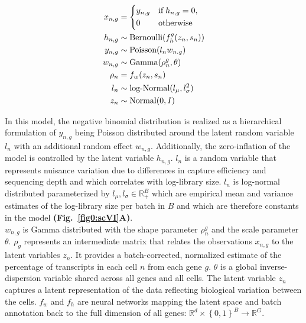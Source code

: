\begin{align*}
x_{n,g} & = 
 \left\lbrace
  \begin{aligned}
    & y_{n,g} && \textnormal{if} \; h_{n,g} = 0,  \\ 
    & 0 && \textnormal{otherwise}    	    
  \end{aligned}
\right.\\
h_{n,g} & \sim \textnormal{Bernoulli}(f_h^g(z_n,s_n))\\
y_{n,g} & \sim \textnormal{Poisson}(l_nw_{n.g})\\
w_{n,g} & \sim \textnormal{Gamma}(\rho^g_n, \theta)\\
\rho_n & = f_w(z_n,s_n)\\
l_n & \sim \textnormal{log-Normal}(l_{\mu},l^2_{\sigma})\\
z_n & \sim \textnormal{Normal}(0,I)
\end{align*}


In this model, the negative binomial distribution is realized as a hierarchical formulation of $y_{n,g}$ being Poisson distributed around the latent random variable $l_n$ with an additional random effect $w_{n,g}$. Additionally, the zero-inflation of the model is controlled by the latent variable $h_{n,g}$. $l_n$ is a random variable that represents nuisance variation due to differences in capture efficiency and sequencing depth and which correlates with log-library size. $l_n$ is log-normal distributed parameterized by $l_\mu,l_\sigma\in\mathbb{R}^B_+$ which are empirical mean and variance estimates of the log-library size per batch in $B$ and which are therefore constants in the model \textbf{(Fig.~\ref{fig0:scVI}A)}.\\

$w_{n,g}$ is Gamma distributed with the shape parameter $\rho_n^g$ and the scale parameter $\theta$. $\rho_g$ represents an intermediate matrix that relates the observations $x_{n,g}$ to the latent variables $z_n$. It provides a batch-corrected, normalized estimate of the percentage of transcripts in each cell $n$ from each gene $g$. $\theta$ is a global inverse-dispersion variable shared across all genes and all cells. The latent variable $z_n$ captures a latent representation of the data reflecting biological variation between the cells. $f_w$ and $f_h$ are neural networks mapping the latent space and batch annotation back to the full dimension of all genes: $\mathbb{R}^d\times{}\left\lbrace0,1\right\rbrace^B\rightarrow\mathbb{R}^G$.\\

